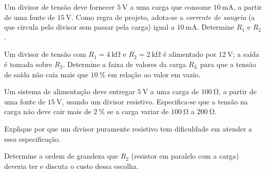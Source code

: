 \blocoaprofundamento
\begin{questao}[3]{}

Um divisor de tensão deve fornecer $\SI{5}{\volt}$ a uma carga que consome
$\SI{10}{\milli\ampere}$, a partir de uma fonte de $\SI{15}{\volt}$. Como regra
de projeto, adota-se a \emph{corrente de sangria} (a que circula pelo divisor sem
passar pela carga) igual a $\SI{10}{\milli\ampere}$. Determine $R_1$ e $R_2$.




\end{questao}
\begin{questao}[3]{}

Um divisor de tensão com $R_1 = \SI{4}{\kilo\ohm}$ e $R_2 = \SI{2}{\kilo\ohm}$ é
alimentado por $\SI{12}{\volt}$; a saída é tomada sobre $R_2$. Determine a faixa
de valores da carga $R_L$ para que a tensão de saída não caia mais que
$\SI{10}{\percent}$ em relação ao valor em vazio.


\end{questao}
\begin{questao}[3]{}

Um sistema de alimentação deve entregar $\SI{5}{\volt}$ a uma carga de
$\SI{100}{\ohm}$, a partir de uma fonte de $\SI{15}{\volt}$, usando um divisor
resistivo. Especifica-se que a tensão na carga não deve cair mais de
$\SI{2}{\percent}$ se a carga variar de $\SI{100}{\ohm}$ a $\SI{200}{\ohm}$.
\begin{itensq}
\item Explique por que um divisor puramente resistivo tem dificuldade em atender
      a essa especificação.
\item Determine a ordem de grandeza que $R_2$ (resistor em paralelo com a carga)
      deveria ter e discuta o custo dessa escolha.
\end{itensq}


\end{questao}

